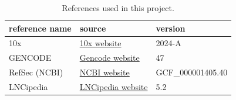 \begin{table}[htbp]
  \centering
  \begin{tabular}{l|ll}
    \toprule
    reference name & source & version \\
    \midrule
    10x & \href{https://www.10xgenomics.com/support/software/cell-ranger/downloads#reference-downloads}{10x website} & 2024-A \\
    GENCODE & \href{https://www.gencodegenes.org/human/}{Gencode website} & 47  \\
    RefSec (NCBI) & \href{https://ftp.ncbi.nlm.nih.gov/genomes/refseq/vertebrate_mammalian/Homo_sapiens/latest_assembly_versions/GCF_000001405.40_GRCh38.p14/}{NCBI website} & GCF\_000001405.40 \\
    LNCipedia & \href{https://lncipedia.org/download}{LNCipedia website} & 5.2 \\
    \bottomrule
  \end{tabular}
  \caption{References used in this project.}
  \label{tab:references}
\end{table}
